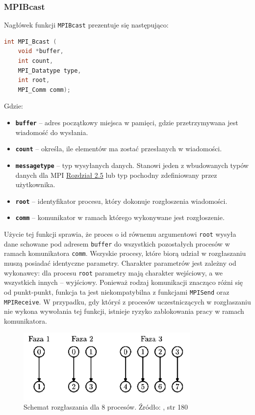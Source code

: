 \subsubsection{MPI\textunderscore Bcast}

Nagłówek funkcji \texttt{MPI\textunderscore Bcast} prezentuje się następująco:

\begin{lstlisting}[language=C]
int MPI_Bcast (
	void *buffer,
	int count,
	MPI_Datatype type,
	int root,
	MPI_Comm comm);
\end{lstlisting}

Gdzie:
\begin{itemize}
	\item \texttt{\textbf{buffer}} -- adres początkowy miejsca w pamięci, gdzie przetrzymywana jest wiadomość do wysłania.
	\item \texttt{\textbf{count}} -- określa, ile elementów ma zostać przesłanych w wiadomości.
	\item \texttt{\textbf{message\textunderscore type}} -- typ wysyłanych danych. Stanowi jeden z wbudowanych typów danych dla MPI \hyperref[table:datatypes]{Rozdział 2.5} lub typ pochodny zdefiniowany przez użytkownika.
	\item \texttt{\textbf{root}} -- identyfikator procesu, który dokonuje rozgłoszenia wiadomości.
	\item \texttt{\textbf{comm}} -- komunikator w ramach którego wykonywane jest rozgłoszenie.
\end{itemize}

Użycie tej funkcji sprawia, że proces o id równemu argumentowi \texttt{root} wysyła dane schowane pod adresem \texttt{buffer} do wszystkich pozostałych procesów w ramach komunikatora \texttt{comm}. Wszyskie procesy, które biorą udział w rozgłaszaniu muszą posiadać identyczne  parametry. Charakter parametrów jest zależny od wykonawcy: dla procesu \texttt{root} parametry mają charakter wejściowy, a we wszystkich innych -- wyjściowy. Ponieważ rodzaj komunikacji znacząco różni się od punkt-punkt, funkcja ta jest niekompatybilna z funkcjami \texttt{MPI\textunderscore Send} oraz \texttt{MPI\textunderscore Receive}. W przypadku, gdy któryś z procesów uczestniczących w rozgłaszaniu nie wykona wywołania tej funkcji, istnieje ryzyko zablokowania pracy w ramach komunikatora. \\

\begin{figure}[h]
	\centering
	\includegraphics[width=0.8\textwidth]{./img/bcast.png}
	\caption{Schemat rozgłaszania dla 8 procesów. Źródło: \cite{Czech}, str 180}
	\label{img:sieć}
\end{figure} 
 

